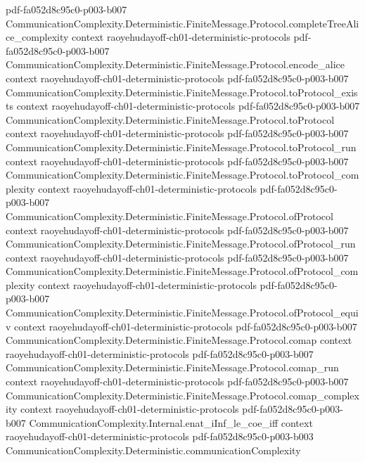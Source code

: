 \begin{theorem}
  {pdf-fa052d8c95c0-p003-b007}
\proofstep
  {CommunicationComplexity.Deterministic.FiniteMessage.Protocol.completeTreeAlice_complexity}
  {context}
  {raoyehudayoff-ch01-deterministic-protocols}
  {pdf-fa052d8c95c0-p003-b007}
\proofstep
  {CommunicationComplexity.Deterministic.FiniteMessage.Protocol.encode_alice}
  {context}
  {raoyehudayoff-ch01-deterministic-protocols}
  {pdf-fa052d8c95c0-p003-b007}
\proofstep
  {CommunicationComplexity.Deterministic.FiniteMessage.Protocol.toProtocol_exists}
  {context}
  {raoyehudayoff-ch01-deterministic-protocols}
  {pdf-fa052d8c95c0-p003-b007}
\proofstep
  {CommunicationComplexity.Deterministic.FiniteMessage.Protocol.toProtocol}
  {context}
  {raoyehudayoff-ch01-deterministic-protocols}
  {pdf-fa052d8c95c0-p003-b007}
\proofstep
  {CommunicationComplexity.Deterministic.FiniteMessage.Protocol.toProtocol_run}
  {context}
  {raoyehudayoff-ch01-deterministic-protocols}
  {pdf-fa052d8c95c0-p003-b007}
\proofstep
  {CommunicationComplexity.Deterministic.FiniteMessage.Protocol.toProtocol_complexity}
  {context}
  {raoyehudayoff-ch01-deterministic-protocols}
  {pdf-fa052d8c95c0-p003-b007}
\proofstep
  {CommunicationComplexity.Deterministic.FiniteMessage.Protocol.ofProtocol}
  {context}
  {raoyehudayoff-ch01-deterministic-protocols}
  {pdf-fa052d8c95c0-p003-b007}
\proofstep
  {CommunicationComplexity.Deterministic.FiniteMessage.Protocol.ofProtocol_run}
  {context}
  {raoyehudayoff-ch01-deterministic-protocols}
  {pdf-fa052d8c95c0-p003-b007}
\proofstep
  {CommunicationComplexity.Deterministic.FiniteMessage.Protocol.ofProtocol_complexity}
  {context}
  {raoyehudayoff-ch01-deterministic-protocols}
  {pdf-fa052d8c95c0-p003-b007}
\proofstep
  {CommunicationComplexity.Deterministic.FiniteMessage.Protocol.ofProtocol_equiv}
  {context}
  {raoyehudayoff-ch01-deterministic-protocols}
  {pdf-fa052d8c95c0-p003-b007}
\proofstep
  {CommunicationComplexity.Deterministic.FiniteMessage.Protocol.comap}
  {context}
  {raoyehudayoff-ch01-deterministic-protocols}
  {pdf-fa052d8c95c0-p003-b007}
\proofstep
  {CommunicationComplexity.Deterministic.FiniteMessage.Protocol.comap_run}
  {context}
  {raoyehudayoff-ch01-deterministic-protocols}
  {pdf-fa052d8c95c0-p003-b007}
\proofstep
  {CommunicationComplexity.Deterministic.FiniteMessage.Protocol.comap_complexity}
  {context}
  {raoyehudayoff-ch01-deterministic-protocols}
  {pdf-fa052d8c95c0-p003-b007}
\proofstep
  {CommunicationComplexity.Internal.enat_iInf_le_coe_iff}
  {context}
  {raoyehudayoff-ch01-deterministic-protocols}
  {pdf-fa052d8c95c0-p003-b003}
\proofstep
  {CommunicationComplexity.Deterministic.communicationComplexity}

\end{theorem}
